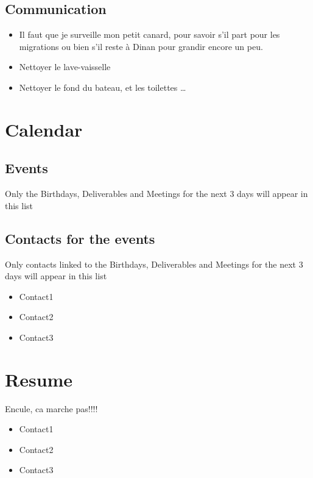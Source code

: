 \documentclass[8pt]{article} %
\begin{document}
\subsection{Communication}
\begin{itemize}
  \item Il faut que je surveille mon petit canard, pour savoir s'il part pour les migrations ou bien s'il reste à Dinan pour grandir encore un peu.
  \item Nettoyer le lave-vaisselle
  \item Nettoyer le fond du bateau, et les toilettes \ldots
\end{itemize}

\section{Calendar}

\subsection{Events}
{\footnotesize
Only the Birthdays, Deliverables and Meetings for the next 3 days will appear in this list\\
}
{\footnotesize

}

\subsection{Contacts for the events}
{\footnotesize
Only contacts linked to the Birthdays, Deliverables and Meetings for the next 3 days will appear in this list\\

}
\begin{itemize}
  \item Contact1 
  \item Contact2 
  \item Contact3 
\end{itemize}

\section{Resume}
%
Encule, ca marche pas!!!!
\begin{itemize}
  \item Contact1 
  \item Contact2 
  \item Contact3 
\end{itemize}
\end{document}
